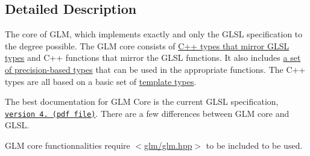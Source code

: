 \subsection{\-Detailed \-Description}
\-The core of \-G\-L\-M, which implements exactly and only the \-G\-L\-S\-L specification to the degree possible. \-The \-G\-L\-M core consists of \hyperlink{group__core__types}{\-C++ types that mirror \-G\-L\-S\-L types} and \-C++ functions that mirror the \-G\-L\-S\-L functions. \-It also includes \hyperlink{group__core__precision}{a set of precision-\/based types} that can be used in the appropriate functions. \-The \-C++ types are all based on a basic set of \hyperlink{group__core__template}{template types}.

\-The best documentation for \-G\-L\-M \-Core is the current \-G\-L\-S\-L specification, \href{http://www.opengl.org/registry/doc/GLSLangSpec.4.20.8.clean.pdf}{\tt version 4. (pdf file)}. \-There are a few differences between \-G\-L\-M core and \-G\-L\-S\-L.

\-G\-L\-M core functionnalities require $<$\hyperlink{glm_8hpp}{glm/glm.\-hpp}$>$ to be included to be used. 